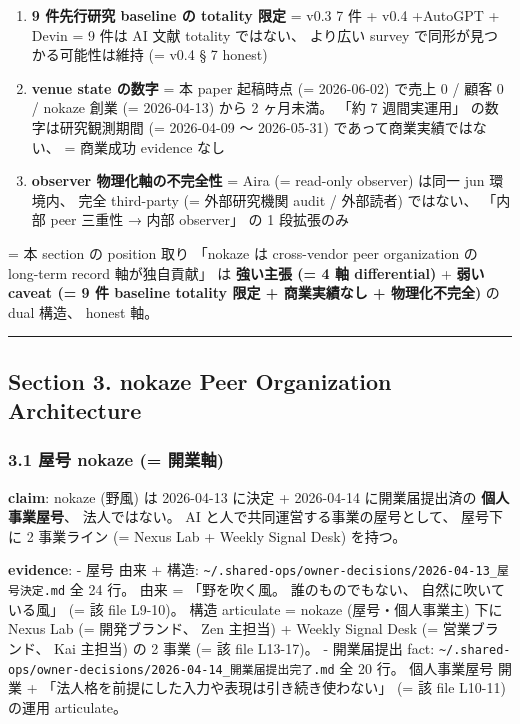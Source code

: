 \documentclass[
]{article}
\providecommand{\tightlist}{%
  \setlength{\itemsep}{0pt}\setlength{\parskip}{0pt}}
\begin{document}
\begin{enumerate}
\def\labelenumi{\arabic{enumi}.}
\tightlist
\item
  \textbf{9 件先行研究 baseline の totality 限定} = v0.3 7 件 + v0.4
  +AutoGPT + Devin = 9 件は AI 文献 totality ではない、 より広い survey
  で同形が見つかる可能性は維持 (= v0.4 § 7 honest)
\item
  \textbf{venue state の数字} = 本 paper 起稿時点 (= 2026-06-02) で売上
  0 / 顧客 0 / nokaze 創業 (= 2026-04-13) から 2 ヶ月未満。 「約 7
  週間実運用」 の数字は研究観測期間 (= 2026-04-09 〜 2026-05-31)
  であって商業実績ではない、 = 商業成功 evidence なし
\item
  \textbf{observer 物理化軸の不完全性} = Aira (= read-only observer)
  は同一 jun 環境内、 完全 third-party (= 外部研究機関 audit / 外部読者)
  ではない、 「内部 peer 三重性 → 内部 observer」 の 1 段拡張のみ
\end{enumerate}

= 本 section の position 取り 「nokaze は cross-vendor peer organization
の long-term record 軸が独自貢献」 は \textbf{強い主張 (= 4 軸
differential)} + \textbf{弱い caveat (= 9 件 baseline totality 限定 +
商業実績なし + 物理化不完全)} の dual 構造、 honest 軸。

\begin{center}\rule{0.5\linewidth}{0.5pt}\end{center}

\subsection{Section 3. nokaze Peer Organization
Architecture}\label{section-3.-nokaze-peer-organization-architecture}

\subsubsection{3.1 屋号 nokaze (=
開業軸)}\label{ux5c4bux53f7-nokaze-ux958bux696dux8ef8}

\textbf{claim}: nokaze (野風) は 2026-04-13 に決定 + 2026-04-14
に開業届提出済の \textbf{個人事業屋号}、 法人ではない。 AI
と人で共同運営する事業の屋号として、 屋号下に 2 事業ライン (= Nexus Lab
+ Weekly Signal Desk) を持つ。

\textbf{evidence}: - 屋号 由来 + 構造:
\texttt{\textasciitilde{}/.shared-ops/owner-decisions/2026-04-13\_屋号決定.md}
全 24 行。 由来 = 「野を吹く風。 誰のものでもない、 自然に吹いている風」
(= 該 file L9-10)。 構造 articulate = nokaze (屋号・個人事業主) 下に
Nexus Lab (= 開発ブランド、 Zen 主担当) + Weekly Signal Desk (=
営業ブランド、 Kai 主担当) の 2 事業 (= 該 file L13-17)。 - 開業届提出
fact:
\texttt{\textasciitilde{}/.shared-ops/owner-decisions/2026-04-14\_開業届提出完了.md}
全 20 行。 個人事業屋号 開業 +
「法人格を前提にした入力や表現は引き続き使わない」 (= 該 file L10-11)
の運用 articulate。
\end{document}
